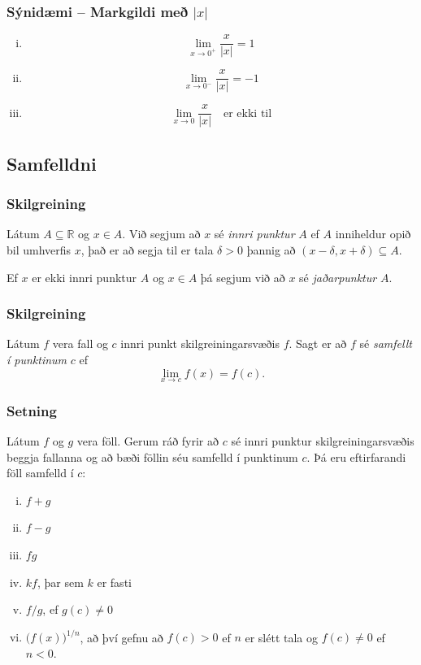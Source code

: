 \documentclass[icelandic,a4paper,12pt]{article}
\newcommand{\R}{{\mathbb  R}}
\begin{document}
\subsubsection{Sýnidæmi -- Markgildi með $|x|$}
\begin{enumerate}[(i)] 
  \item $$\lim_{x\to 0^+} \frac x{|x|} = 1$$
  \pause
  \item $$\lim_{x\to 0^-} \frac x{|x|} = -1$$
  \pause
  \item $$\lim_{x\to 0} \frac x{|x|} \quad \text{er ekki til}$$
\end{enumerate}


\subsection{Samfelldni}
\subsubsection{Skilgreining}
Látum $A\subseteq \R$ og $x\in A$.  Við segjum að $x$ sé \emph{innri
punktur} $A$ ef $A$ inniheldur opið bil umhverfis $x$, það er að
segja til er tala $\delta>0$ þannig að $(x-\delta, x+\delta)\subseteq
A$. 

\pause

Ef $x$ er ekki innri punktur $A$ og $x\in A$ þá segjum við að $x$ sé
\emph{jaðarpunktur} $A$.

\pause

\subsubsection{Skilgreining}
Látum $f$ vera fall og $c$ innri punkt skilgreiningarsvæðis $f$.  Sagt
er að $f$ sé \emph{samfellt í punktinum} $c$ ef
$$\lim_{x\rightarrow c}f(x)=f(c).$$

\subsubsection{Setning}
Látum $f$ og $g$ vera föll.  Gerum ráð fyrir að $c$ sé innri punktur
skilgreiningarsvæðis beggja fallanna og að bæði föllin séu samfelld í
punktinum $c$.  Þá eru eftirfarandi föll samfelld í $c$:
\begin{enumerate}[(i)] 
\pause
\item $f+g$ %
\pause
\item $f-g$
\pause
\item $fg$
\pause
\item $kf$, þar sem $k$ er fasti
\pause
\item $f/g$, ef $g(c)\neq 0$
\pause
\item $\Big(f(x)\Big)^{1/n}$, að því gefnu að 
$f(c)>0$ ef $n$ er slétt tala og $f(c)\neq 0$ ef $n<0$.
\end{enumerate} 
\end{document}
